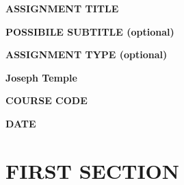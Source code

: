 \documentclass{article}
\begin{document}
\begin{center}
\huge
\textbf{ASSIGNMENT TITLE}


\large
\textbf{POSSIBILE SUBTITLE (optional)}
\vspace{1.5mm}


\huge
\textbf{ASSIGNMENT TYPE (optional)}
\vspace{3mm}


\large
\textbf{Joseph Temple}
\vspace{1mm}


\textbf{COURSE CODE}
\vspace{1mm}


\textbf{DATE}
\vspace{1cm}
\end{center}


\section{FIRST SECTION}
\end{document}
